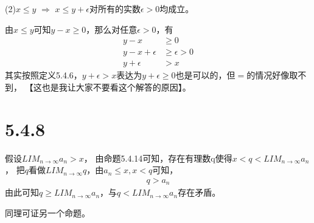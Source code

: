 \documentclass{article}
\theoremstyle{mystyle}
\begin{document}
(2)$x \leq y$ $\Rightarrow$ $x \leq y + \epsilon$对所有的实数$\epsilon > 0$均成立。

由$x \leq y$可知$y - x \geq 0$，那么对任意$\epsilon > 0$，有
\begin{align*}
  y - x            & \geq 0             \\
  y - x + \epsilon & \geq \epsilon  > 0 \\
  y + \epsilon     & > x
\end{align*}
其实按照定义5.4.6，$y + \epsilon > x$表达为$y + \epsilon \geq 0$也是可以的，但$=$的情况好像取不到，
【这也是我让大家不要看这个解答的原因】。

\section*{5.4.8}

假设$LIM_{n \rightarrow \infty}a_n > x$，
由命题5.4.14可知，存在有理数q使得$x < q < LIM_{n \rightarrow \infty}a_n$，
把$q$看做$LIM_{n \rightarrow \infty}q$，由$a_n \leq x, x < q$可知，
\begin{align*}
  q > a_n
\end{align*}
由此可知$q \geq LIM_{n \rightarrow \infty}a_n$，与$q < LIM_{n \rightarrow \infty}a_n$存在矛盾。

同理可证另一个命题。
\end{document}

